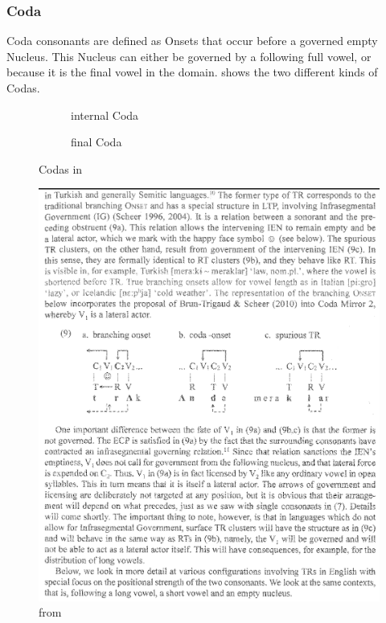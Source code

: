 \subsubsection{Coda}\label{intro:obj:coda}
Coda consonants are defined as Onsets that occur before
a governed empty Nucleus. \parencite[p.~192]{scheer2004}
This Nucleus can either be governed by a following full
vowel,  or because it is the final
vowel in the domain.
 shows the two different kinds
of Codas.

\begin{figure}[h]
  \centering
  \begin{subfigure}{.49\textwidth}
    \centering
    \begin{structure}{}
      \emptyV[gov]
    \end{structure}
    \caption{internal Coda}
  \end{subfigure}
  \hfill
  \begin{subfigure}{.49\textwidth}
    \centering
    \begin{structure}{}
      \fen
    \end{structure}
    \caption{final Coda}
  \end{subfigure}
  \caption{Codas in \CVCV}
  \label{fig:intro:obj:coda}
\end{figure}

\begin{figure}
  \includegraphics{figures/note_phon_objects_coda_ig.png}
  \caption{from \cite[p.~12]{scheerCyran2017}}
\end{figure}


